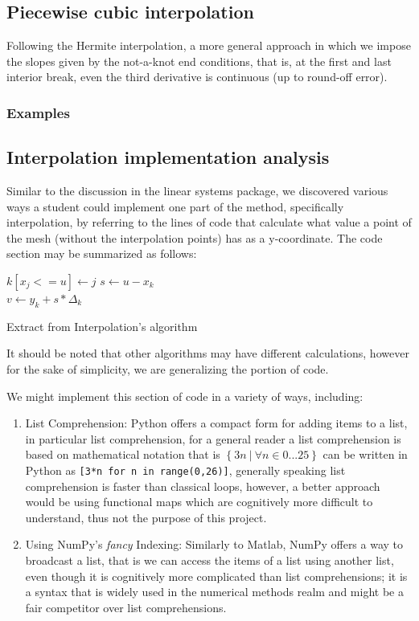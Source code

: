 \subsection{Piecewise cubic interpolation}
Following the Hermite interpolation, a more general approach in which we impose the slopes given by the not-a-knot end conditions, that is, at the first and last interior break, even the third derivative is continuous (up to round-off error). \cite{PCHIP}

\subsubsection{Examples}
	

\subsection{Interpolation implementation analysis}

Similar to the discussion in the linear systems package, we discovered various ways a student could implement one part of the method, specifically interpolation, by referring to the lines of code that calculate what value a point of the mesh (without the interpolation points) has as a y-coordinate. The code section may be summarized as follows: 



\begin{algorithm}[H]
\SetAlgoLined
{} {
$k[x_j <= u] \gets j$
}
$s \gets u - x_k$\\
$v \gets y_k + s * \Delta_k$

\caption{Extract from Interpolation's algorithm}
\end{algorithm}
It should be noted that other algorithms may have different calculations, however for the sake of simplicity, we are generalizing the portion of code.


We might implement this section of code in a variety of ways, including:
\begin{enumerate}
    \item List Comprehension: Python offers a compact form for adding items to a list, in particular list comprehension, for a general reader a list comprehension is based on mathematical notation that is $\left\{ 3n\ |\ \forall n\in 0...25\right\}$ can be written in Python as \lstinline|[3*n for n in range(0,26)]|, generally speaking list comprehension is faster than classical loops\cite{PythonSpeedPerformanceTips}, however, a better approach would be using functional maps which are cognitively more difficult to understand, thus not the purpose of this project.

    \item Using NumPy's \textit{fancy} Indexing: Similarly to Matlab, NumPy offers a way to broadcast a list, that is we can access the items of a list using another list, even though it is cognitively more complicated than list comprehensions; it is a syntax that is widely used in the numerical methods realm and might be a fair competitor over list comprehensions.
    
\end{enumerate}
